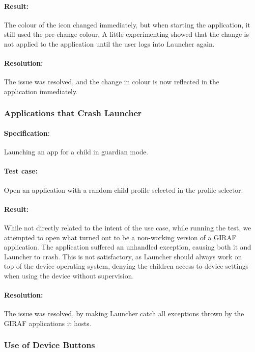 \paragraph{Result:} The colour of the icon changed immediately, but when starting the application, it still used the pre-change colour. A little experimenting showed that the change is not applied to the application until the user logs into Launcher again.
\paragraph{Resolution:} The issue was resolved, and the change in colour is now reflected in the application immediately.

\subsubsection*{Applications that Crash Launcher}
\paragraph{Specification:} Launching an app for a child in guardian mode.
\paragraph{Test case:} Open an application with a random child profile selected in the profile selector.
\paragraph{Result:} While not directly related to the intent of the use case, while running the test, we attempted to open what turned out to be a non-working version of a GIRAF application. The application suffered an unhandled exception, causing both it and Launcher to crash. This is not satisfactory, as Launcher should always work on top of the device operating system, denying the children access to device settings when using the device without supervision.
\paragraph{Resolution:} The issue was resolved, by making Launcher catch all exceptions thrown by the GIRAF applications it hosts.

\subsubsection*{Use of Device Buttons}
